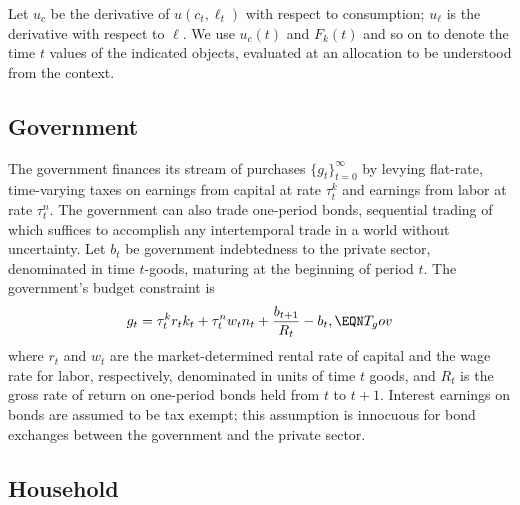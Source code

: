 Let $u_c$   be the
derivative of $u(c_t, \ell_t)$ with respect to consumption;
$u_\ell$ is the derivative with
respect to $\ell$.
 We use $u_c(t)$ and $F_k(t)$ and so on
to denote the time $t$ values of the indicated objects,
evaluated at an allocation to be understood from the
context.


\subsection{Government}

The government finances its stream of purchases
$\{g_t\}_{t=0}^\infty$ by levying
flat-rate, time-varying taxes on earnings from  capital  at
rate $\tau^k_{t}$ and earnings from labor at rate $\tau^n_{t}$.
The government can also trade one-period bonds, sequential
trading of which
suffices to accomplish any intertemporal
trade in a world without uncertainty. Let $b_t$ be government
indebtedness to the private sector, denominated in time $t$-goods,
maturing at the beginning of period $t$. The government's
budget constraint is
$$ g_t =  \tau^k_t r_t k_t + \tau^n_t w_t n_t + {b_{t+1} \over R_t} - b_t ,
                                                              \EQN T_gov $$
where $r_t$ and $w_t$ are the market-determined rental rate of capital
and the wage rate for labor, respectively, denominated
in units of time $t$ goods,  and  $R_t$ is the gross rate
of return on one-period bonds held from $t$ to $t+1$. Interest earnings
on bonds are assumed to be tax exempt; this assumption is innocuous
for bond exchanges  between the government and the private sector.


\subsection{Household}\label{Household_PVbc}

